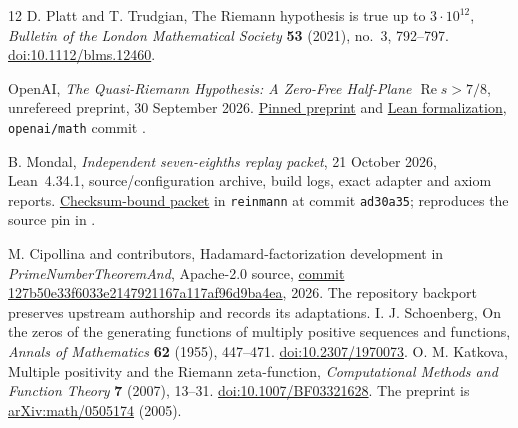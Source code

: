 \documentclass[11pt]{amsart}
\newcommand{\Repart}{\operatorname{Re}}
\begin{document}
\clearpage
\begin{thebibliography}{12}
D. Platt and T. Trudgian, The Riemann hypothesis is true up to $3\cdot10^{12}$,
\emph{Bulletin of the London Mathematical Society} \textbf{53} (2021), no.~3,
792--797. \href{https://doi.org/10.1112/blms.12460}{doi:10.1112/blms.12460}.
\begingroup\raggedright
OpenAI, \emph{The Quasi-Riemann Hypothesis: A Zero-Free Half-Plane
$\Repart s>7/8$}, unrefereed preprint, 30 September 2026.
\href{https://github.com/openai/math/blob/1581d4cbdd69a0faf34b2089614fe2a814316a6a/preprints/The-Quasi-Riemann-Hypothesis-September-30-2026/paper.pdf}{Pinned preprint}
and \href{https://github.com/openai/math/tree/1581d4cbdd69a0faf34b2089614fe2a814316a6a/lean}{Lean formalization},
\texttt{openai/math} commit
.\par\endgroup
{}
B. Mondal, \emph{Independent seven-eighths replay packet}, 21 October 2026,
Lean~4.34.1, source/configuration archive, build logs, exact adapter and axiom
reports. \href{https://github.com/sciencenerd-des/reinmann/tree/ad30a35e93474981528c24d91ae93338ad34958f/research/prime_spectral/verification_2026_10_21_external_seven_eighths}{Checksum-bound packet}
in \texttt{reinmann} at commit \texttt{ad30a35}; reproduces the source pin
in \cite{openai78}.

M. Cipollina and contributors, Hadamard-factorization development in
\emph{PrimeNumberTheoremAnd}, Apache-2.0 source,
\href{https://github.com/AlexKontorovich/PrimeNumberTheoremAnd/tree/127b50e33f6033e2147921167a117af96d9ba4ea}{commit 127b50e33f6033e2147921167a117af96d9ba4ea}, 2026.
The repository backport preserves upstream authorship and records its adaptations.
I. J. Schoenberg, On the zeros of the generating functions of multiply positive
sequences and functions, \emph{Annals of Mathematics} \textbf{62} (1955), 447--471.
\href{https://doi.org/10.2307/1970073}{doi:10.2307/1970073}.
O. M. Katkova, Multiple positivity and the Riemann zeta-function,
\emph{Computational Methods and Function Theory} \textbf{7} (2007), 13--31.
\href{https://doi.org/10.1007/BF03321628}{doi:10.1007/BF03321628}.
The preprint is \href{https://arxiv.org/abs/math/0505174}{arXiv:math/0505174} (2005).


\end{thebibliography}
\end{document}
